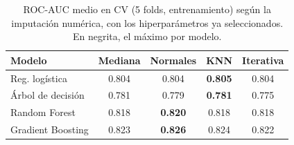 \begin{table}[!t]
\centering
\footnotesize
\caption{ROC-AUC medio en CV (5 folds, entrenamiento) según la imputación numérica, con los hiperparámetros ya seleccionados. En negrita, el máximo por modelo.}
\label{tab:imputation}
\setlength{\tabcolsep}{4pt}
\begin{tabular}{lcccc}
\toprule
Modelo & Mediana & Normales & KNN & Iterativa \\
\midrule
Reg. logística & 0.804 & 0.804 & \textbf{0.805} & 0.804 \\
Árbol de decisión & 0.781 & 0.779 & \textbf{0.781} & 0.775 \\
Random Forest & 0.818 & \textbf{0.820} & 0.818 & 0.818 \\
Gradient Boosting & 0.823 & \textbf{0.826} & 0.824 & 0.822 \\
\bottomrule
\end{tabular}
\end{table}

